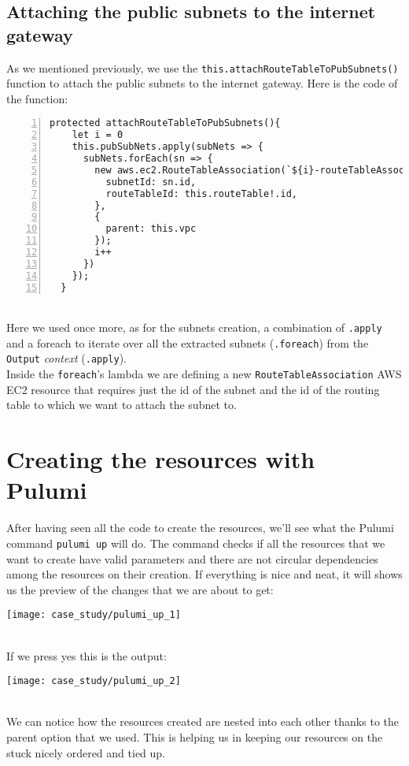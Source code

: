 \subsection{Attaching the public subnets to the internet gateway}
As we mentioned previously, we use the \texttt{this.attachRouteTableToPubSubnets()} function to attach the public subnets to the internet gateway.
Here is the code of the function:
\begin{lstlisting}[numbers=left, numberstyle=\tiny, numbersep=-5pt, stepnumber=1]
  protected attachRouteTableToPubSubnets(){
    let i = 0
    this.pubSubNets.apply(subNets => {
      subNets.forEach(sn => {
        new aws.ec2.RouteTableAssociation(`${i}-routeTableAssociation-typescript`, {
          subnetId: sn.id,
          routeTableId: this.routeTable!.id,
        },
        {
          parent: this.vpc
        });
        i++
      })
    });
  }
\end{lstlisting}\mbox{}\\
Here we used once more, as for the subnets creation, a combination of \texttt{.apply} and a foreach to iterate over all the extracted subnets (\texttt{.foreach}) from the \texttt{Output} \textit{context} (\texttt{.apply}).\\
Inside the \texttt{foreach}'s lambda we are defining a new \texttt{RouteTableAssociation} AWS EC2 resource that requires just the id of the subnet and the id of the routing table to which we want to attach the subnet to.

\section{Creating the resources with Pulumi}
After having seen all the code to create the resources, we'll see what the Pulumi command \texttt{pulumi up} will do.
The command checks if all the resources that we want to create have valid parameters and there are not circular dependencies among the resources on their creation.
If everything is nice and neat, it will shows us the preview of the changes that we are about to get:
\begin{center}
  \texttt{[image: case\_study/pulumi\_up\_1]} 
\end{center}\mbox{}\\

If we press yes this is the output:
\begin{center}
  \texttt{[image: case\_study/pulumi\_up\_2]} 
\end{center}\mbox{}\\
We can notice how the resources created are nested into each other thanks to the parent option that we used.
This is helping us in keeping our resources on the stuck nicely ordered and tied up.\\


